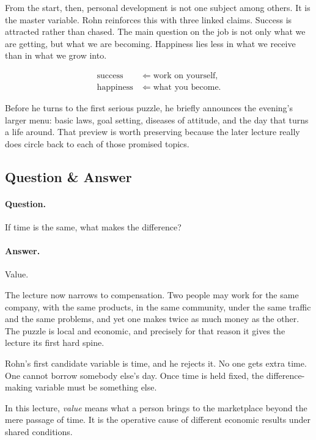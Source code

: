 From the start, then, personal development is not one subject among others. It is the master variable. Rohn reinforces this with three linked claims. Success is attracted rather than chased. The main question on the job is not only what we are getting, but what we are becoming. Happiness lies less in what we receive than in what we grow into.

\begin{align}
\text{success} &\Leftarrow \text{work on yourself},\\
\text{happiness} &\Leftarrow \text{what you become}.
\end{align}

Before he turns to the first serious puzzle, he briefly announces the evening's larger menu: basic laws, goal setting, diseases of attitude, and the day that turns a life around. That preview is worth preserving because the later lecture really does circle back to each of those promised topics.

\subsection{Question \& Answer}

\paragraph{Question.} If time is the same, what makes the difference?

\paragraph{Answer.} Value.

The lecture now narrows to compensation. Two people may work for the same company, with the same products, in the same community, under the same traffic and the same problems, and yet one makes twice as much money as the other. The puzzle is local and economic, and precisely for that reason it gives the lecture its first hard spine.

Rohn's first candidate variable is time, and he rejects it. No one gets extra time. One cannot borrow somebody else's day. Once time is held fixed, the difference-making variable must be something else.

\begin{definition}
In this lecture, \emph{value} means what a person brings to the marketplace beyond the mere passage of time. It is the operative cause of different economic results under shared conditions.
\end{definition}

